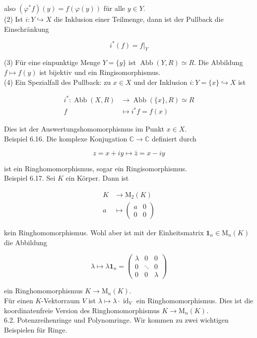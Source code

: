 \documentclass[10pt, letterpaper]{article}
\begin{document}
also $\left(\varphi^{*} f\right)(y)=f(\varphi(y))$ für alle $y \in Y$.\\
(2) Ist $i: Y \hookrightarrow X$ die Inklusion einer Teilmenge, dann ist der Pullback die Einschränkung

$$
i^{*}(f)=\left.f\right|_{Y}
$$

(3) Für eine einpunktige Menge $Y=\{y\}$ ist $\operatorname{Abb}(Y, R) \simeq R$. Die Abbildung $f \mapsto f(y)$ ist bijektiv und ein Ringisomorphismus.\\
(4) Ein Spezialfall des Pullback: zu $x \in X$ und der Inklusion $i: Y=\{x\} \hookrightarrow X$ ist

$$
\begin{aligned}
i^{*}: \operatorname{Abb}(X, R) & \rightarrow \operatorname{Abb}(\{x\}, R) \simeq R \\
f & \mapsto i^{*} f=f(x)
\end{aligned}
$$

Dies ist der Auswertungshomomorphismus im Punkt $x \in X$.\\
Beispiel 6.16. Die komplexe Konjugation $\mathbb{C} \rightarrow \mathbb{C}$ definiert durch

$$
z=x+i y \mapsto \bar{z}=x-i y
$$

ist ein Ringhomomorphismus, sogar ein Ringisomorphismus.\\
Beispiel 6.17. Sei $K$ ein Körper. Dann ist

$$
\begin{aligned}
K & \rightarrow \mathrm{M}_{2}(K) \\
a & \mapsto\left(\begin{array}{ll}
a & 0 \\
0 & 0
\end{array}\right)
\end{aligned}
$$

kein Ringhomomorphismus. Wohl aber ist mit der Einheitsmatrix $\mathbf{1}_{n} \in \mathrm{M}_{n}(K)$ die Abbildung

$$
\lambda \mapsto \lambda \mathbf{1}_{n}=\left(\begin{array}{ccc}
\lambda & 0 & 0 \\
0 & \ddots & 0 \\
0 & 0 & \lambda
\end{array}\right)
$$

ein Ringhomomorphismus $K \rightarrow \mathrm{M}_{n}(K)$.\\
Für einen $K$-Vektorraum $V$ ist $\lambda \mapsto \lambda \cdot \operatorname{id}_{V}$ ein Ringhomomorphismus. Dies ist die koordinatenfreie Version des Ringhomomorphismus $K \rightarrow \mathrm{M}_{n}(K)$.\\
6.2. Potenzreihenringe und Polynomringe. Wir kommen zu zwei wichtigen Beispielen für Ringe.
\end{document}
